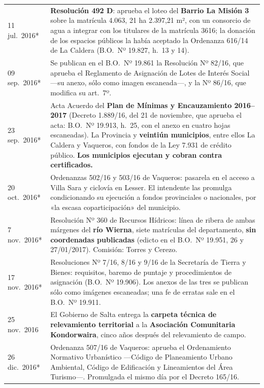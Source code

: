 \begin{longtable}{@{}p{2.7cm}p{10.3cm}@{}}
11 jul.\ 2016* & \textbf{Resolución 492 D}: aprueba el loteo del \textbf{Barrio La Misión 3} sobre la matrícula 4.063, 21 ha 2.397,21 m², con un consorcio de agua a integrar con los titulares de la matrícula 3616; la donación de los espacios públicos la había aceptado la Ordenanza 616/14 de La Caldera (B.O.\ Nº 19.827, h.\ 13 y 14). \\
09 sep.\ 2016* & Se publican en el B.O.\ Nº 19.861 la Resolución Nº 82/16, que aprueba el Reglamento de Asignación de Lotes de Interés Social ---su anexo, sólo como imagen escaneada---, y la Nº 86/16, que modifica su art.\ 7º. \\
23 sep.\ 2016* & Acta Acuerdo del \textbf{Plan de Mínimas y Encauzamiento 2016--2017} (Decreto 1.889/16, del 21 de noviembre, que aprueba el acta: B.O.\ Nº 19.913, h.\ 25, con el anexo en cuatro hojas escaneadas). La Provincia y \textbf{veintiún municipios}, entre ellos La Caldera y Vaqueros, con fondos de la Ley 7.931 de crédito público. \textbf{Los municipios ejecutan y cobran contra certificados.} \\
20 oct.\ 2016* & Ordenanzas 502/16 y 503/16 de Vaqueros: pasarela en el acceso a Villa Sara y ciclovía en Lesser. El intendente las promulga condicionando su ejecución a fondos provinciales o nacionales, por «la escasa coparticipación» del municipio. \\
7 nov.\ 2016* & Resolución Nº 360 de Recursos Hídricos: línea de ribera de ambas márgenes del \textbf{río Wierna}, siete matrículas del departamento, \textbf{sin coordenadas publicadas} (edicto en el B.O.\ Nº 19.951, 26 y 27/01/2017). Comisión: Torres y Cerezo. \\
17 nov.\ 2016* & Resoluciones Nº 7/16, 8/16 y 9/16 de la Secretaría de Tierra y Bienes: requisitos, baremo de puntaje y procedimientos de asignación (B.O.\ Nº 19.906). Los anexos de las tres se publican sólo como imágenes escaneadas; una fe de erratas sale en el B.O.\ Nº 19.911. \\
25 nov.\ 2016 & El Gobierno de Salta entrega la \textbf{carpeta técnica de relevamiento territorial} a la \textbf{Asociación Comunitaria Kondorwaira}, cinco años después del relevamiento de campo. \\
26 dic.\ 2016* & Ordenanza 507/16 de Vaqueros: aprueba el Ordenamiento Normativo Urbanístico ---Código de Planeamiento Urbano Ambiental, Código de Edificación y Lineamientos del Área Turismo---. Promulgada el mismo día por el Decreto 165/16. \\

\end{longtable}
